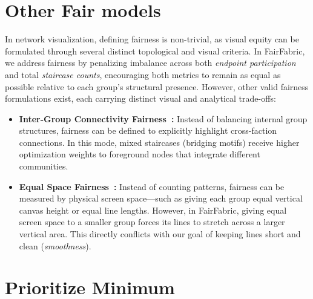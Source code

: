 \documentclass[onecolumn]{egpubl}
\newcommand{\FairFabric}{\textsf{FairFabric}\xspace}
\begin{document}
 \section{Other Fair models}
\label{sec:alternative_fairness}

In network visualization, defining fairness is non-trivial, as visual equity can be formulated through several distinct topological and visual criteria. In \FairFabric, we address fairness by penalizing imbalance across both \emph{endpoint participation} and total \emph{staircase counts}, encouraging both metrics to remain as equal as possible relative to each group's structural presence. However, other valid fairness formulations exist, each carrying distinct visual and analytical trade-offs:

\begin{itemize}    
    \item \textbf{Inter-Group Connectivity Fairness~\cite{piselli2026f2}:} Instead of balancing internal group structures, fairness can be defined to explicitly highlight cross-faction connections. In this mode, mixed staircases (bridging motifs) receive higher optimization weights to foreground nodes that integrate different communities.

    \item \textbf{Equal Space Fairness~\cite{EadesHLMNPW25}:} Instead of counting patterns, fairness can be measured by physical screen space—such as giving each group equal vertical canvas height or equal line lengths. However, in \FairFabric, giving equal screen space to a smaller group forces its lines to stretch across a larger vertical area. This directly conflicts with our goal of keeping lines short and clean (\emph{smoothness}).
\end{itemize}


\section{Prioritize Minimum}
\label{sec:prioritize_min}
\end{document}
